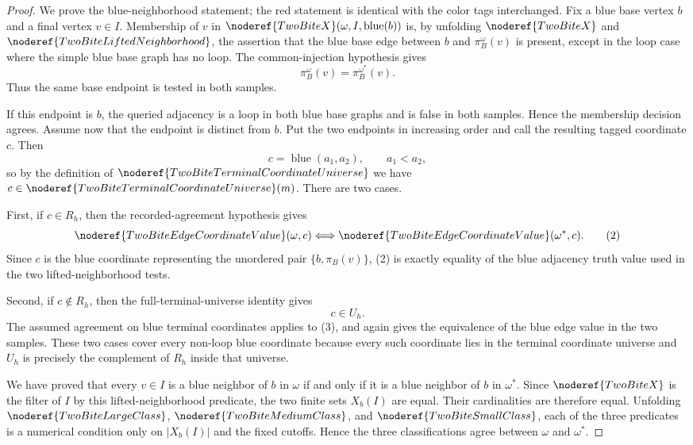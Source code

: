 \begin{proof}
We prove the blue-neighborhood statement; the red statement is identical with
the color tags interchanged.  Fix a blue base vertex \(b\) and a final vertex
\(v\in I\).  Membership of \(v\) in
\(\noderef{TwoBiteX}(\omega,I,\operatorname{blue}(b))\) is, by unfolding
\(\noderef{TwoBiteX}\) and \(\noderef{TwoBiteLiftedNeighborhood}\), the
assertion that the blue base edge between \(b\) and
\(\pi_B^\omega(v)\) is present, except in the loop case where the simple blue
base graph has no loop.  The common-injection hypothesis gives
\[
\pi_B^\omega(v)=\pi_B^{\omega^\ast}(v).
\tag{1}
\]
Thus the same base endpoint is tested in both samples.

If this endpoint is \(b\), the queried adjacency is a loop in both blue base
graphs and is false in both samples.  Hence the membership decision agrees.
Assume now that the endpoint is distinct from \(b\).  Put the two endpoints
in increasing order and call the resulting tagged coordinate \(c\).  Then
\[
c=\operatorname{blue}(a_1,a_2),\qquad a_1<a_2,
\]
so by the definition of \(\noderef{TwoBiteTerminalCoordinateUniverse}\) we
have \(c\in\noderef{TwoBiteTerminalCoordinateUniverse}(m)\).  There are two
cases.

First, if \(c\in R_h\), then the recorded-agreement hypothesis gives
\[
\noderef{TwoBiteEdgeCoordinateValue}(\omega,c)
\Longleftrightarrow
\noderef{TwoBiteEdgeCoordinateValue}(\omega^\ast,c).
\tag{2}
\]
Since \(c\) is the blue coordinate representing the unordered pair
\(\{b,\pi_B(v)\}\), (2) is exactly equality of the blue adjacency truth value
used in the two lifted-neighborhood tests.

Second, if \(c\notin R_h\), then the full-terminal-universe identity gives
\[
c\in U_h.
\tag{3}
\]
The assumed agreement on blue terminal coordinates applies to (3), and again
gives the equivalence of the blue edge value in the two samples.  These two
cases cover every non-loop blue coordinate because every such coordinate lies
in the terminal coordinate universe and \(U_h\) is precisely the complement
of \(R_h\) inside that universe.

We have proved that every \(v\in I\) is a blue neighbor of \(b\) in
\(\omega\) if and only if it is a blue neighbor of \(b\) in
\(\omega^\ast\).  Since
\(\noderef{TwoBiteX}\) is the filter of \(I\) by this lifted-neighborhood
predicate, the two finite sets \(X_b(I)\) are equal.  Their cardinalities are
therefore equal.  Unfolding
\(\noderef{TwoBiteLargeClass}\), \(\noderef{TwoBiteMediumClass}\), and
\(\noderef{TwoBiteSmallClass}\), each of the three predicates is a numerical
condition only on \(|X_b(I)|\) and the fixed cutoffs.  Hence the three
classifications agree between \(\omega\) and \(\omega^\ast\).


\end{proof}
